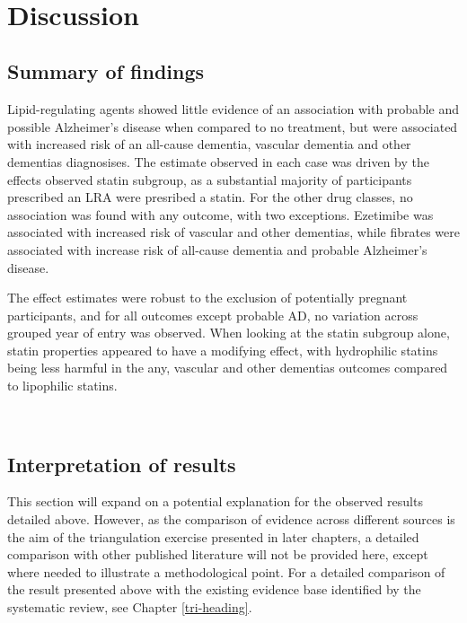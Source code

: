 \documentclass[a4paper, twoside]{templates/ociamthesis}
\begin{document}
~

\hypertarget{discussion-2}{%
\section{Discussion}\label{discussion-2}}

\hypertarget{summary-of-findings-1}{%
\subsection{Summary of findings}\label{summary-of-findings-1}}

Lipid-regulating agents showed little evidence of an association with probable and possible Alzheimer's disease when compared to no treatment, but were associated with increased risk of an all-cause dementia, vascular dementia and other dementias diagnosises. The estimate observed in each case was driven by the effects observed statin subgroup, as a substantial majority of participants prescribed an LRA were presribed a statin. For the other drug classes, no association was found with any outcome, with two exceptions. Ezetimibe was associated with increased risk of vascular and other dementias, while fibrates were associated with increase risk of all-cause dementia and probable Alzheimer's disease.

The effect estimates were robust to the exclusion of potentially pregnant participants, and for all outcomes except probable AD, no variation across grouped year of entry was observed. When looking at the statin subgroup alone, statin properties appeared to have a modifying effect, with hydrophilic statins being less harmful in the any, vascular and other dementias outcomes compared to lipophilic statins.

~

\hypertarget{interpretation-of-results}{%
\subsection{Interpretation of results}\label{interpretation-of-results}}

This section will expand on a potential explanation for the observed results detailed above. However, as the comparison of evidence across different sources is the aim of the triangulation exercise presented in later chapters, a detailed comparison with other published literature will not be provided here, except where needed to illustrate a methodological point. For a detailed comparison of the result presented above with the existing evidence base identified by the systematic review, see Chapter \ref{tri-heading}.
\end{document}

